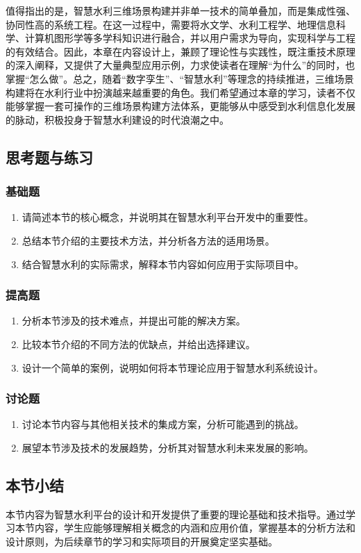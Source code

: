 值得指出的是，智慧水利三维场景构建并非单一技术的简单叠加，而是集成性强、协同性高的系统工程。在这一过程中，需要将水文学、水利工程学、地理信息科学、计算机图形学等多学科知识进行融合，并以用户需求为导向，实现科学与工程的有效结合。因此，本章在内容设计上，兼顾了理论性与实践性，既注重技术原理的深入阐释，又提供了大量典型应用示例，力求使读者在理解``为什么''的同时，也掌握``怎么做''。总之，随着``数字孪生''、``智慧水利''等理念的持续推进，三维场景构建将在水利行业中扮演越来越重要的角色。我们希望通过本章的学习，读者不仅能够掌握一套可操作的三维场景构建方法体系，更能够从中感受到水利信息化发展的脉动，积极投身于智慧水利建设的时代浪潮之中。 \subsection{思考题与练习}\label{ux601dux8003ux9898ux4e0eux7ec3ux4e60} \subsubsection{基础题}\label{ux57faux7840ux9898} \begin{enumerate} \def\labelenumi{\arabic{enumi}.} \item 请简述本节的核心概念，并说明其在智慧水利平台开发中的重要性。 \item 总结本节介绍的主要技术方法，并分析各方法的适用场景。 \item 结合智慧水利的实际需求，解释本节内容如何应用于实际项目中。 \end{enumerate} \subsubsection{提高题}\label{ux63d0ux9ad8ux9898} \begin{enumerate} \def\labelenumi{\arabic{enumi}.} \setcounter{enumi}{3} \item 分析本节涉及的技术难点，并提出可能的解决方案。 \item 比较本节介绍的不同方法的优缺点，并给出选择建议。 \item 设计一个简单的案例，说明如何将本节理论应用于智慧水利系统设计。 \end{enumerate} \subsubsection{讨论题}\label{ux8ba8ux8bbaux9898} \begin{enumerate} \def\labelenumi{\arabic{enumi}.} \setcounter{enumi}{6} \item 讨论本节内容与其他相关技术的集成方案，分析可能遇到的挑战。 \item 展望本节涉及技术的发展趋势，分析其对智慧水利未来发展的影响。 \end{enumerate} \subsection{本节小结}\label{ux672cux8282ux5c0fux7ed3} 本节内容为智慧水利平台的设计和开发提供了重要的理论基础和技术指导。通过学习本节内容，学生应能够理解相关概念的内涵和应用价值，掌握基本的分析方法和设计原则，为后续章节的学习和实际项目的开展奠定坚实基础。

